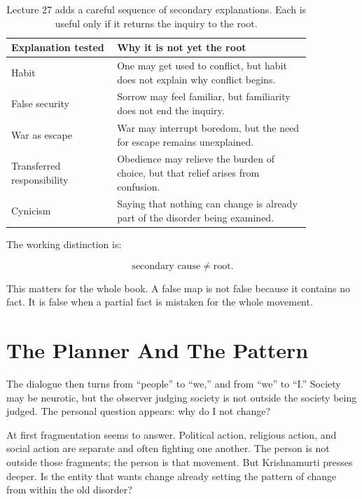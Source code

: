 \documentclass[11pt,oneside]{book}
\begin{document}
\begin{table}
\centering
\begin{tabular}{|p{0.30\linewidth}|p{0.55\linewidth}|}
\hline
\textbf{Explanation tested} & \textbf{Why it is not yet the root} \\
\hline
Habit & One may get used to conflict, but habit does not explain why conflict begins. \\
\hline
False security & Sorrow may feel familiar, but familiarity does not end the inquiry. \\
\hline
War as escape & War may interrupt boredom, but the need for escape remains unexplained. \\
\hline
Transferred responsibility & Obedience may relieve the burden of choice, but that relief arises from confusion. \\
\hline
Cynicism & Saying that nothing can change is already part of the disorder being examined. \\
\hline
\end{tabular}
\caption{Lecture 27 adds a careful sequence of secondary explanations. Each is useful only if it returns the inquiry to the root.}
\end{table}

The working distinction is:

\begin{equation}
\text{secondary cause} \neq \text{root}.
\end{equation}

This matters for the whole book. A false map is not false because it contains no fact. It is false when a partial fact is mistaken for the whole movement.

\section{The Planner And The Pattern}

The dialogue then turns from ``people'' to ``we,'' and from ``we'' to ``I.'' Society may be neurotic, but the observer judging society is not outside the society being judged. The personal question appears: why do I not change?

At first fragmentation seems to answer. Political action, religious action, and social action are separate and often fighting one another. The person is not outside those fragments; the person is that movement. But Krishnamurti presses deeper. Is the entity that wants change already setting the pattern of change from within the old disorder?
\end{document}
